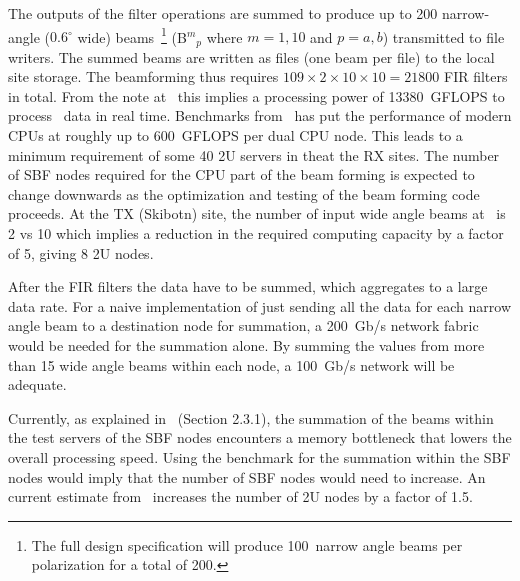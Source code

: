 \documentclass[12pt,a4paper]{article}
\begin{document}

The outputs of the filter operations are summed to produce up to 200 narrow-angle ($0.6^{\circ}$ wide) beams~\footnote{The full \ED design specification will produce 100~narrow angle beams per polarization for a total of 200.}  (B${^m}{_p}$ where $m=1,10$ and $p=a,b$) 
transmitted to file writers.
The summed beams are written as files (one beam per file) to the local site storage.
The beamforming thus requires $109\times 2\times 10\times 10=21800$ FIR filters in total. 
From the note at~\cite{assars-note} this implies a processing power of 13380~GFLOPS to process \NBW\ data in real time. 
Benchmarks from~\cite{assars-note} has put the performance of modern CPUs at roughly up to 600~GFLOPS per dual CPU node. 
This leads to a minimum requirement of some 40 2U servers in the\SBF at the RX sites.
The number of SBF nodes required for the CPU part of the beam forming is expected to change downwards as the optimization and testing of the beam forming code proceeds.
At the TX (Skibotn) site, the number of input wide angle beams at \NBW\ is 2 vs 10 which implies a reduction in the required computing capacity by a factor of 5, giving 8 2U nodes.

After the FIR filters the data have to be summed, which aggregates to a large data rate. 
For a naive implementation of just sending all the data for each narrow angle beam to a destination node for summation, a 200~Gb/s network fabric would be needed for the summation alone. 
By summing the values from more than 15 wide angle beams within each node, a 100~Gb/s network will be adequate.

Currently, as explained in~\cite{assars-note} (Section 2.3.1), the summation of the beams within the test servers of the SBF nodes encounters a memory bottleneck that lowers the overall processing speed.
Using the benchmark for the summation within the SBF nodes would imply that the number of SBF nodes would need to increase.
An current estimate from~\cite{assars-note} increases the number of 2U nodes by a factor of 1.5.
\end{document}
